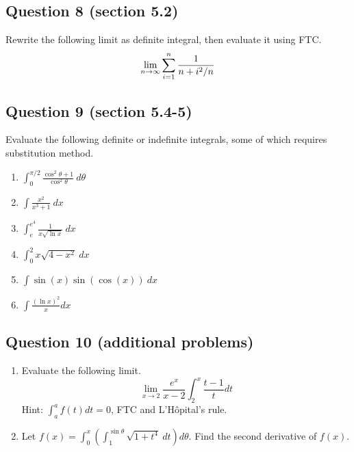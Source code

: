 \documentclass[12pt]{amsart}
\theoremstyle{plain}
\theoremstyle{definition}
\begin{document}
\subsection*{Question 8 (section 5.2)}
Rewrite the following limit as definite integral, then evaluate it using FTC.
\[\lim_{n\to\infty}\sum_{i=1}^n{1\over n+i^2/n}\]\vspace{4cm}
\subsection*{Question 9 (section 5.4-5)}Evaluate the following definite or indefinite integrals, some of which requires substitution method.
\begin{enumerate}
	\item $\displaystyle \int_{0}^{\pi/2}\frac{\cos^2\theta+1}{\cos^2\theta}\ d\theta$\vspace{3cm}
	\item $\displaystyle \int\frac{x^2}{x^3+1}\ dx$\vspace{3cm}
	\item $\displaystyle \int_e^{e^4}\displaystyle\frac{1}{x\sqrt{\ln{x}}}\ dx$\vspace{3cm}
	\item $\displaystyle \int_0^2x\sqrt{4-x^2}\ dx$\vspace{3cm}
	\item $\displaystyle \int \sin(x)\sin\left(\cos (x)\right)\ dx $\vspace{3cm}
	\item $\displaystyle \int \frac{{(\ln x)}^2}{x} dx$\vspace{3cm}
\end{enumerate}
\subsection*{Question 10 (additional problems)}
\begin{enumerate}
	\item Evaluate the following limit.
	\[\lim_{x\to 2}\frac{e^x}{x-2}\int_2^x \frac{t-1}{t}dt \]
	Hint: $\displaystyle \int_a^af(t)dt=0$, FTC and L'H\^{o}pital’s rule.\vspace{4cm}
	\item Let $\displaystyle f(x)=\int_0^x\left(\int_1^{\sin \theta}\sqrt{1+t^4}\ dt\right)d\theta$. Find the second derivative of $f(x)$.\vspace{4cm}
	
\end{enumerate}
\end{document}
